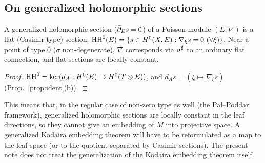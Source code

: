 \subsection{On generalized holomorphic sections}\label{sec:ghfun}
\begin{obs}\tP\label{obs:casimir}
A generalized holomorphic section ($\bar\partial_Es=0$) of a Poisson module $(E,\nabla)$ is a flat (Casimir-type) section: $\HH^0(E)=\{s\in H^0(X,E):\nabla_\xi s=0\ (\forall\xi)\}$. Near a point of type $0$ ($\sigma$ non-degenerate), $\nabla$ corresponds via $\sigma^\sharp$ to an ordinary flat connection, and flat sections are locally constant.
\end{obs}
\begin{proof}
$\mathrm{HH}^0=\ker(d_A:H^0(E)\to H^0(T\otimes E))$, and $d_As=(\xi\mapsto\nabla_\xi s)$ (Prop.~\ref{prop:ident}(b)).
\end{proof}
\begin{rem}\tK
This means that, in the regular case of non-zero type as well (the Pal--Poddar framework), generalized holomorphic sections are locally constant in the leaf directions, so they cannot give an embedding of $M$ into projective space. A generalized Kodaira embedding theorem will have to be reformulated as a map to the leaf space (or to the quotient separated by Casimir sections). The present note does not treat the generalization of the Kodaira embedding theorem itself.
\end{rem}

